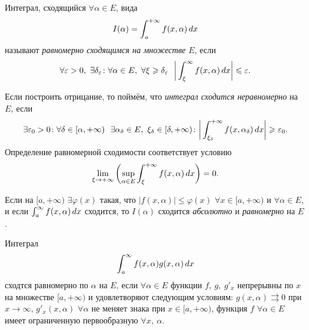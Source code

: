 
\begin{to_def}
    Интеграл, сходящийся $\forall \alpha \in E$, вида
    \begin{equation*}
        I(\alpha) = \int_a^{+\infty} f(x, \alpha) \, d x
    \end{equation*}
    называют \textit{равномерно сходящимся на множестве} $E$, если 
    \begin{equation*}
        \forall \varepsilon > 0, \ \exists \delta_\varepsilon \colon  \forall \alpha \in E, \ \forall \xi \geqslant \delta_\varepsilon \ \ \bigg|
            \int_\xi^{\infty} f(x, \alpha) \, d x
        \bigg| \leqslant \varepsilon.
    \end{equation*}
\end{to_def}

\noindent
Если построить отрицание, то поймём, что \textit{интеграл сходится неравномерно} на $E$, если
\begin{equation*}
    \exists \varepsilon_0 > 0 \colon  \forall \delta \in [\alpha, + \infty) \ \  \exists \alpha_\delta \in E, \ \xi_\delta \in [\delta, +\infty) \colon 
    \bigg|
        \int_{\xi_\delta}^{+\infty} f(x, \alpha_\delta) \, d x
    \bigg| \geqslant \varepsilon_0.
\end{equation*}
Определение равномерной сходимости соответствует условию
\begin{equation*}
    \lim_{\xi \to + \infty}
    \left(\sup_{\alpha \in E} \int_\xi^{+\infty} f(x, \alpha) \, d x \right)
    = 0.
\end{equation*}


\begin{to_lem}
    Если на $[a, + \infty)$ $\exists \varphi(x)$ такая, что $|f(x, \alpha)| \leq \varphi(x)$ $\forall x \in [a, +\infty)$ и $\forall \alpha \in E$, и если $\int_a^{\infty} f(x, \alpha) \, d x$ сходится, то $I(\alpha)$ сходится \textit{абсолютно} и \textit{равномерно} на $E$. 
\end{to_lem}


\begin{to_lem}
    Интеграл 
\begin{equation*}
    \int_a^{\infty} f(x, \alpha) g(x, \alpha) \, d x
\end{equation*}
сходтся равномерно по $\alpha$ на $E$, если $\forall \alpha \in E$ функции $f, \ g, \ g'_x$ непрерывны по $x$ на множестве $[a, +\infty)$ и удовлетворяют следующим условиям: $g(x, \alpha) \rightrightarrows 0$ при $x \to \infty$, $g'_x (x, \alpha)$ $\forall \alpha$ не меняет знака при $x \in [a, + \infty)$,
функция $f$ $\forall \alpha \in E$ имеет ограниченную первообразную $\forall x, \ \alpha$.
\end{to_lem}


